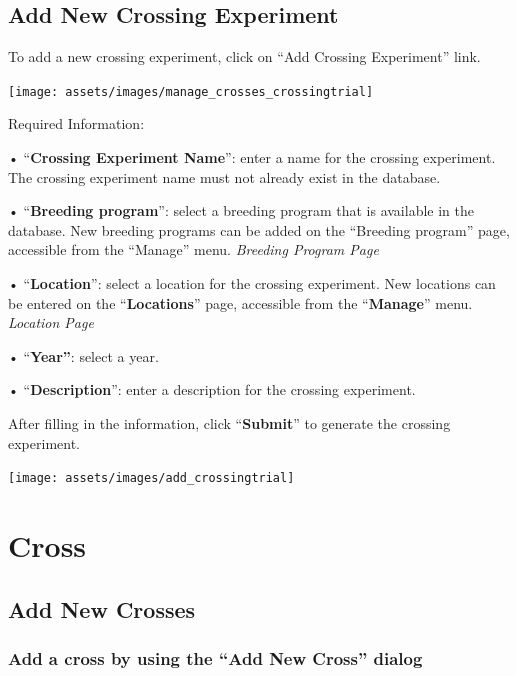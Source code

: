 \documentclass[
  12pt,
]{book}
\begin{document}
\hypertarget{add-new-crossing-experiment}{%
\subsection{Add New Crossing Experiment}\label{add-new-crossing-experiment}}

To add a new crossing experiment, click on ``Add Crossing Experiment'' link.

\begin{center}\texttt{[image: assets/images/manage\_crosses\_crossingtrial]} \end{center}

Required Information:

• ``\textbf{Crossing Experiment Name}'': enter a name for the crossing experiment. The crossing experiment name must not already exist in the database.

• ``\textbf{Breeding program}'': select a breeding program that is available in the database. New breeding programs can be added on the ``Breeding program'' page, accessible from the ``Manage'' menu. \emph{Breeding Program Page}

• ``\textbf{Location}'': select a location for the crossing experiment. New locations can be entered on the ``\textbf{Locations}'' page, accessible from the ``\textbf{Manage}'' menu. \emph{Location Page}

• ``\textbf{Year''}: select a year.

• ``\textbf{Description}'': enter a description for the crossing experiment.

After filling in the information, click ``\textbf{Submit}'' to generate the crossing experiment.

\begin{center}\texttt{[image: assets/images/add\_crossingtrial]} \end{center}

\hypertarget{cross}{%
\section{Cross}\label{cross}}

\hypertarget{add-new-crosses}{%
\subsection{Add New Crosses}\label{add-new-crosses}}

\hypertarget{add-a-cross-by-using-the-add-new-cross-dialog}{%
\subsubsection*{Add a cross by using the ``Add New Cross'' dialog}\label{add-a-cross-by-using-the-add-new-cross-dialog}}
\end{document}
